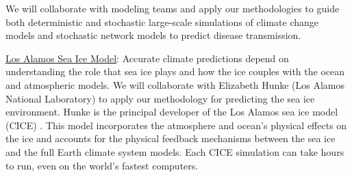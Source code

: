 \documentclass[11pt]{NSFamsart}
\newcommand{\Upara}[1]{\noindent\underline{\upshape #1}:}
\begin{document}
We will collaborate with modeling teams and apply our methodologies to guide both deterministic and stochastic large-scale simulations of climate change models and stochastic network models to predict disease transmission. 


\Upara{Los Alamos Sea Ice Model}
Accurate climate predictions depend on understanding the role that sea ice plays and how the ice couples with the ocean and atmospheric models.
We will collaborate with Elizabeth Hunke (Los Alamos National Laboratory) to apply our methodology for predicting the sea ice environment. Hunke is the principal developer of the Los Alamos sea ice model (CICE) \cite{hunke2017cice, hunke2010cice}. 
This model incorporates the atmosphere and ocean's physical effects on the ice and accounts for the physical feedback mechanisms between the sea ice and the full Earth climate system models. Each CICE simulation can take hours to run, even on the world's fastest computers.
\end{document}
